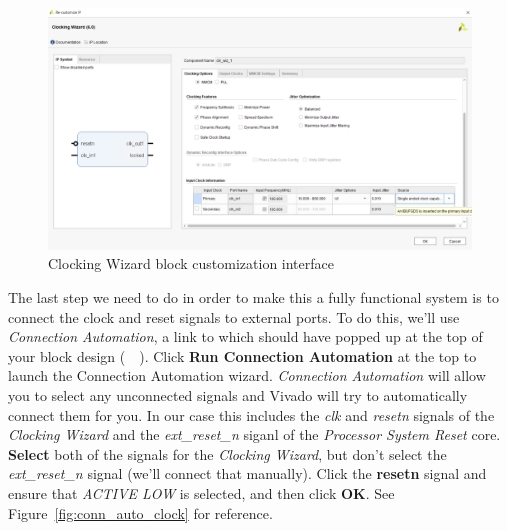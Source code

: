\documentclass[11pt]{article}
\begin{document}
\begin{figure}[h]
    \centering
    \includegraphics[width=\textwidth]{images/customize_clock.png}
    \caption{Clocking Wizard block customization interface}
    \label{fig:customize_clock}
\end{figure}

The last step we need to do in order to make this a fully functional system is to connect the clock and reset signals to external ports. To do this, we'll use \textit{Connection Automation}, a link to which should have popped up at the top of your block design 
(~~). Click \textbf{Run Connection Automation} at the top to launch the Connection Automation wizard. \textit{Connection Automation} will allow you to select any unconnected signals and Vivado will try to automatically connect them for you. In our case this includes the \textit{clk} and \textit{resetn} signals of the \textit{Clocking Wizard} and the \textit{ext\_reset\_n} siganl of the \textit{Processor System Reset} core. \textbf{Select} both of the signals for the \textit{Clocking Wizard}, but don't select the \textit{ext\_reset\_n} signal (we'll connect that manually). Click the \textbf{resetn} signal and ensure that \textit{ACTIVE LOW} is selected, and then click \textbf{OK}. See Figure~\ref{fig:conn_auto_clock} for reference.
\end{document}
